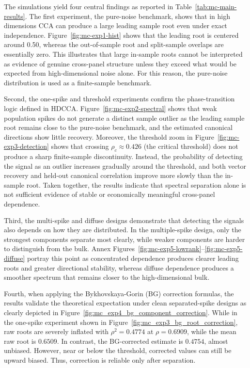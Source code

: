 \documentclass[12pt]{report} %
\begin{document}
The simulations yield four central findings as reported in Table~\ref{tab:mc-main-results}.
The first experiment, the pure-noise benchmark, shows that in high dimensions CCA 
can produce a large leading sample root even under exact independence. 
Figure~\ref{fig:mc-exp1-hist} shows that the leading root is centered around 0.50, 
whereas the out-of-sample root and split-sample overlaps are essentially zero. 
This illustrates that large in-sample roots 
cannot be interpreted as evidence of genuine cross-panel structure 
unless they exceed what would be expected from high-dimensional noise alone. For this reason, 
the pure-noise distribution is used as a finite-sample benchmark.

Second, the one-spike and threshold experiments confirm the phase-transition logic defined in HDCCA. 
Figure~\ref{fig:mc-exp2-spectral} shows that weak population spikes 
do not generate a distinct sample outlier as the leading sample root remains close to the pure-noise
benchmark, and the estimated canonical directions show little recovery. Moreover, the threshold zoom in 
Figure~\ref{fig:mc-exp3-detection} shows that crossing 
\(\rho_c \approx 0.426\) (the critical threshold) does not produce a sharp 
finite-sample discontinuity. Instead, the probability of detecting the signal as an outlier 
increases gradually around the threshold, and both vector recovery and held-out canonical 
correlation improve more slowly than the in-sample root. Taken together, the results indicate
that spectral separation alone is not sufficient evidence of stable or economically meaningful 
cross-panel dependence.

Third, the multi-spike and diffuse designs demonstrate that detecting the signals also depends on how 
they are distributed. In the multiple-spike design, only the strongest components separate most 
clearly, while weaker components are harder to distinguish from the bulk. 
Annex Figures~\ref{fig:mc-exp5-lowrank}--\ref{fig:mc-exp5-diffuse}
portray this point as concentrated dependence produces clearer leading roots and greater directional
stability, whereas diffuse dependence 
produces a smoother spectrum that remains closer to the high-dimensional bulk.

Fourth, when applying the Bykhovskaya-Gorin (BG) correction formulas, the results validate
the theoretical expectation under clean separated-spike designs as clearly depicted in 
Figure~\ref{fig:mc_exp4_bg_component_correction}. While in the one-spike experiment shown in 
Figure~\ref{fig:mc_exp3_bg_root_correction}, raw roots are severely inflated with 
\(\rho^2=0.4774\) at \(\rho=0.6909\), while the mean raw root is \(0.6509\). 
In contrast, the BG-corrected estimate is \(0.4754\), almost unbiased. 
However, near or below the threshold, corrected values can still be upward biased. 
Thus, correction is reliable only after separation. 
\end{document}
